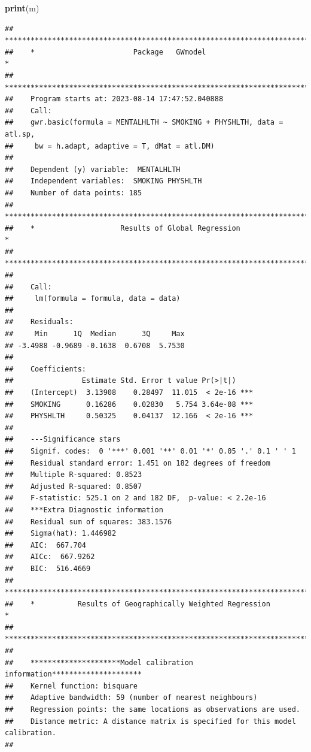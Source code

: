 \documentclass[
]{book}
\newenvironment{Shaded}{\begin{snugshade}}{\end{snugshade}}
\newcommand{\FunctionTok}[1]{\textcolor[rgb]{0.13,0.29,0.53}{\textbf{#1}}}
\newcommand{\NormalTok}[1]{#1}
\begin{document}
\begin{Shaded}
\begin{Highlighting}[]
\FunctionTok{print}\NormalTok{(m)}
\end{Highlighting}
\end{Shaded}

\begin{verbatim}
##    ***********************************************************************
##    *                       Package   GWmodel                             *
##    ***********************************************************************
##    Program starts at: 2023-08-14 17:47:52.040888 
##    Call:
##    gwr.basic(formula = MENTALHLTH ~ SMOKING + PHYSHLTH, data = atl.sp, 
##     bw = h.adapt, adaptive = T, dMat = atl.DM)
## 
##    Dependent (y) variable:  MENTALHLTH
##    Independent variables:  SMOKING PHYSHLTH
##    Number of data points: 185
##    ***********************************************************************
##    *                    Results of Global Regression                     *
##    ***********************************************************************
## 
##    Call:
##     lm(formula = formula, data = data)
## 
##    Residuals:
##     Min      1Q  Median      3Q     Max 
## -3.4988 -0.9689 -0.1638  0.6708  5.7530 
## 
##    Coefficients:
##                Estimate Std. Error t value Pr(>|t|)    
##    (Intercept)  3.13908    0.28497  11.015  < 2e-16 ***
##    SMOKING      0.16286    0.02830   5.754 3.64e-08 ***
##    PHYSHLTH     0.50325    0.04137  12.166  < 2e-16 ***
## 
##    ---Significance stars
##    Signif. codes:  0 '***' 0.001 '**' 0.01 '*' 0.05 '.' 0.1 ' ' 1 
##    Residual standard error: 1.451 on 182 degrees of freedom
##    Multiple R-squared: 0.8523
##    Adjusted R-squared: 0.8507 
##    F-statistic: 525.1 on 2 and 182 DF,  p-value: < 2.2e-16 
##    ***Extra Diagnostic information
##    Residual sum of squares: 383.1576
##    Sigma(hat): 1.446982
##    AIC:  667.704
##    AICc:  667.9262
##    BIC:  516.4669
##    ***********************************************************************
##    *          Results of Geographically Weighted Regression              *
##    ***********************************************************************
## 
##    *********************Model calibration information*********************
##    Kernel function: bisquare 
##    Adaptive bandwidth: 59 (number of nearest neighbours)
##    Regression points: the same locations as observations are used.
##    Distance metric: A distance matrix is specified for this model calibration.
## 

\end{verbatim}
\end{document}

